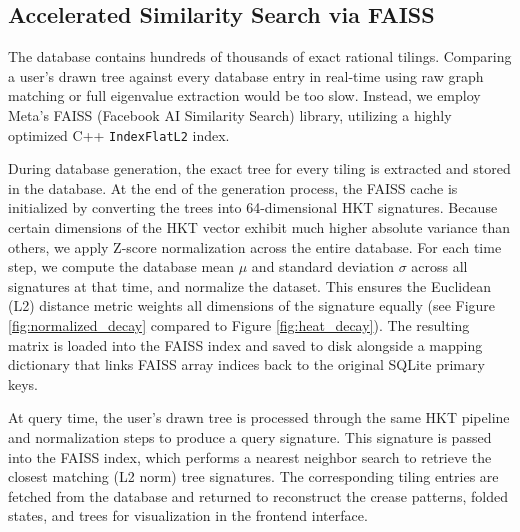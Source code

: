 \documentclass[11pt]{article}
\begin{document}
\subsection{Accelerated Similarity Search via FAISS}
The database contains hundreds of thousands of exact rational tilings. Comparing a user's drawn tree against every database entry in real-time using raw graph matching or full eigenvalue extraction would be too slow. Instead, we employ Meta's FAISS (Facebook AI Similarity Search) library, utilizing a highly optimized C++ \texttt{IndexFlatL2} index.

During database generation, the exact tree for every tiling is extracted and stored in the database. At the end of the generation process, the FAISS cache is initialized by converting the trees into 64-dimensional HKT signatures. Because certain dimensions of the HKT vector exhibit much higher absolute variance than others, we apply Z-score normalization across the entire database. For each time step, we compute the database mean $\mu$ and standard deviation $\sigma$ across all signatures at that time, and normalize the dataset. This ensures the Euclidean (L2) distance metric weights all dimensions of the signature equally (see Figure \ref{fig:normalized_decay} compared to Figure \ref{fig:heat_decay}). The resulting matrix is loaded into the FAISS index and saved to disk alongside a mapping dictionary that links FAISS array indices back to the original SQLite primary keys.

At query time, the user's drawn tree is processed through the same HKT pipeline and normalization steps to produce a query signature. This signature is passed into the FAISS index, which performs a nearest neighbor search to retrieve the closest matching (L2 norm) tree signatures. The corresponding tiling entries are fetched from the database and returned to reconstruct the crease patterns, folded states, and trees for visualization in the frontend interface.
\end{document}

